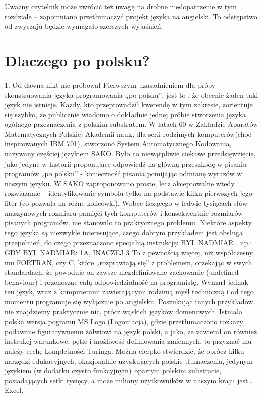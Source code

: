 Uważny czytelnik może zwrócić też uwagę na drobne niedopatrzenie w tym rozdziale – zapomniano  przetłumaczyć projekt języka na angielski. To odstępstwo od zwyczaju będzie wymagało szerszych wyjaśnień.

\section{Dlaczego po polsku?}
1. Od dawna nikt nie próbował
Pierwszym uzasadnieniem dla próby skonstruowania języka programowania „po polsku”, jest to , że obecnie żaden taki język nie istnieje. Każdy, kto przeprowadził kwerendę w tym zakresie, zorientuje się szybko, że publicznie wiadomo o dokładnie jednej próbie stworzenia języka ogólnego przeznaczenia z polskim substratem.
W latach 60 w Zakładzie Aparatów Matematycznych Polskiej Akademii nauk, dla serii rodzimych komputerów(choć inspirowanych IBM 701), stworzono System Automatycznego Kodowania, nazywany częściej językiem SAKO. Było to niewątpliwie ciekawe przedsięwzięcie, jako jedyne w historii proponujące odpowiedź na główną przeszkodę w pisaniu programów „po polsku” - konieczność pisania pomijając odmianę wyrazów w naszym języku. W SAKO zaproponowano proste, lecz akceptowalne wtedy rozwiązanie – identyfikowanie symbolu tylko na podstawie kilku pierwszych jego liter (co pozwala na różne końcówki). Wobec liczącego w ledwie tysiącach słów maszynowych rozmiaru pamięci tych komputerów i konsekwentnie rozmiarów pisanych programów, nie stanowiło to praktycznego problemu. 
Niektóre aspekty tego języka są niezwykle interesujące, czego dobrym przykładem jest obsługa przepełnień, do czego przeznaczono specjalną instrukcję:
BYL NADMIAR , np.:
GDY BYL NADMIAR: 1A, INACZEJ 3 
To z pewnością więcej, niż współczesny mu FORTRAN, czy C, które „rozprawiają się” z problemem, orzekając w swych standardach, że powoduje on zawsze niezdefiniowane zachowanie (undefined behaviour) i przenosząc całą odpowiedzialność na programistę.
Wymarł jednak ten język, wraz z komputerami zawierającymi rodzimą myśl techniczną i od tego momentu programuje się wyłącznie po angielsku.
Poszukując innych przykładów, nie znajdziemy praktycznie nic, prócz wąskich języków domenowych. Istniała polska wersja pogramu MS Logo (Logomacja), gdzie przetłumaczono rozkazy podawane figuratywnemu żółwiowi na język polski, a jako, że zawierał on również instrukcj warunkowe, pętle i możliwość definiowania zmiennych, to przyznać mu należy cechę kompletności Turinga. Można cierpko stwierdzić, że oprócz kilku narzędzi edukacyjnych, okazjonalnie uzyskujących polskie tłumaczenia, jedynym językiem (w dodatku czysto funkcyjnym) opartym polskim substracie, posiadających setki tysięcy, a może miliony użytkowników w naszym kraju jest… Excel.

